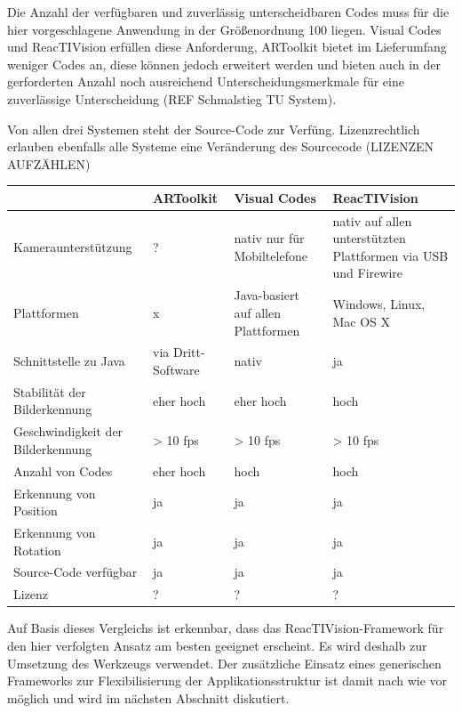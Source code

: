 Die Anzahl der verfügbaren und zuverlässig unterscheidbaren Codes muss für die hier vorgeschlagene Anwendung in der Größenordnung 100 liegen. Visual Codes und ReacTIVision erfüllen diese Anforderung, ARToolkit bietet im Lieferumfang weniger Codes an, diese können jedoch erweitert werden und bieten auch in der gerforderten Anzahl noch ausreichend Unterscheidungsmerkmale für eine zuverlässige Unterscheidung (REF Schmalstieg TU System).

Von allen drei Systemen steht der Source-Code zur Verfüng. Lizenzrechtlich erlauben ebenfalls alle Systeme eine Veränderung des Sourcecode (LIZENZEN AUFZÄHLEN)

\begin{center}
	\begin{tabular}{| p{3cm} || p{3cm} | p{3cm} | p{3cm} |} \hline
		 & ARToolkit & Visual Codes & ReacTIVision \\ \hline \hline
		Kamera\-unterstützung 		  		& ? & nativ nur für Mobiltelefone & nativ auf allen unterstützten Plattformen via USB und Firewire \\ \hline
		Plattformen 			  	  		& x & Java-basiert auf allen Plattformen & Windows, Linux, Mac OS X \\ \hline
		Schnittstelle zu Java 		  		& via Dritt-Software & nativ & ja \\ \hline
		Stabilität der Bilderkennung 	  	& eher hoch & eher hoch & hoch \\ \hline
		Geschwindigkeit der Bilderkennung 	& > 10 fps & > 10 fps & > 10 fps \\ \hline
		Anzahl von Codes 		  			& eher hoch & hoch & hoch \\ \hline
		Erkennung von Position 		  		& ja & ja & ja \\ \hline
		Erkennung von Rotation 				& ja & ja & ja \\ \hline
		Source-Code verfügbar 			  	& ja & ja & ja \\ \hline
		Lizenz 				 				& ? & ? & ? \\ \hline
	\end{tabular}
\end{center}

Auf Basis dieses Vergleichs ist erkennbar, dass das ReacTIVision-Framework für den hier verfolgten Ansatz am besten geeignet erscheint. Es wird deshalb zur Umsetzung des Werkzeugs verwendet. Der zusätzliche Einsatz eines generischen Frameworks zur Flexibilisierung der Applikationsstruktur ist damit nach wie vor möglich und wird im nächsten Abschnitt diskutiert.

